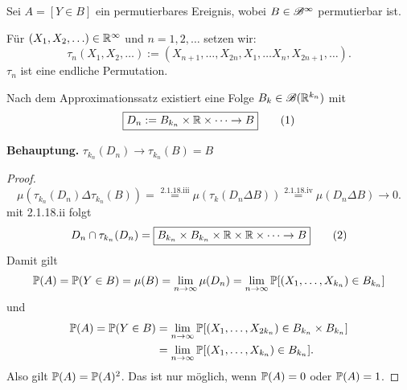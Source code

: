 \begin{prgp}
  Sei $A = [Y \in B]$ ein permutierbares Ereignis, wobei $B \in \mathscr{B}^\infty$
  permutierbar ist.

  Für $(X_1, X_2, \ldots) \in \mathbb{R}^\infty$ und $n=1, 2, \ldots$ setzen wir:
  \[ \tau_n( X_1, X_2, \ldots ) := ( X_{n+1}, \ldots, X_{2n}, X_1, \ldots X_n,
    X_{2n+1}, \ldots ). \]
  $\tau_n$ ist eine endliche Permutation.

  Nach dem Approximationssatz existiert eine Folge $B_k \in \mathscr{B}(\mathbb{R}^{k_n})$
  mit
  \[ \boxed{ D_n := B_{k_n} \times \mathbb{R} \times \cdots \to B } \tag{1} \]
  
  \textbf{Behauptung.} $\tau_{k_n} (D_n) \to \tau_{k_n} (B) = B$
  \begin{proof}
    \[ \mu( \tau_{k_n}( D_n ) \Delta \tau_{k_n}(B)) =
      \overset{\text{2.1.18.iii}}{=}
      \mu( \tau_k( D_n \Delta B)  )
      \overset{\text{2.1.18.iv}}{=}
      \mu( D_n \Delta B ) \to 0.
    \]
    mit 2.1.18.ii folgt
    \[ D_n \cap \tau_{k_n} (D_n) = \boxed{ B_{k_n} \times B_{k_n} \times \mathbb{R}
        \times \mathbb{R} \times \cdots \to B} \tag{2} \]
    Damit gilt
    \begin{align*}
      \mathbb{P}(A) = \mathbb{P}( Y \in B ) = \mu(B) = \lim_{n \to \infty} \mu( D_n)
             = \lim_{n \to \infty} \mathbb{P} [ (X_1, \ldots, X_{k_n}) \in B_{k_n} ]
    \end{align*}
    und
    \begin{align*}
      \mathbb{P}(A) = \mathbb{P}( Y \in B )
      &= \lim_{n \to \infty} \mathbb{P} [ (X_1, \ldots, X_{2k_n}) \in B_{k_n} \times B_{k_n} ] \\
      &= \lim_{n \to \infty} \mathbb{P} [ (X_1, \ldots, X_{k_n}) \in B_{k_n} ].
    \end{align*}
    Also gilt $\mathbb{P}(A) = \mathbb{P}(A)^2$. Das ist nur möglich, wenn $\mathbb{P}(A) = 0$ oder
    $\mathbb{P}(A) = 1$.
  \end{proof}
\end{prgp}